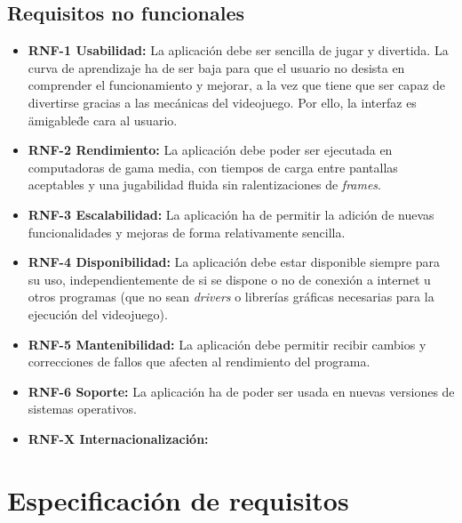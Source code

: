 \subsection{Requisitos no funcionales}
\begin{itemize}
\tightlist
\item 
	\textbf{RNF-1 Usabilidad:} La aplicación debe ser sencilla de jugar y divertida. La curva de aprendizaje ha de ser baja para que el usuario no desista en comprender el funcionamiento y mejorar, a la vez que tiene que ser capaz de divertirse gracias a las mecánicas del videojuego. Por ello, la interfaz es \"amigable\" de cara al usuario.

\item 
	\textbf{RNF-2 Rendimiento:} La aplicación debe poder ser ejecutada en computadoras de gama media, con tiempos de carga entre pantallas aceptables y una jugabilidad fluida sin ralentizaciones de \textit{frames}.
	
\item 
	\textbf{RNF-3 Escalabilidad:} La aplicación ha de permitir la adición de nuevas funcionalidades y mejoras de forma relativamente sencilla.
	
\item 
	\textbf{RNF-4 Disponibilidad:} La aplicación debe estar disponible siempre para su uso, independientemente de si se dispone o no de conexión a internet u otros programas (que no sean \textit{drivers} o librerías gráficas necesarias para la ejecución del videojuego).
	
\item 
	\textbf{RNF-5 Mantenibilidad:} La aplicación debe permitir recibir cambios y correcciones de fallos que afecten al rendimiento del programa.
	
\item 
	\textbf{RNF-6 Soporte:} La aplicación ha de poder ser usada en nuevas versiones de sistemas operativos.

\item 
	\textbf{RNF-X Internacionalización:} 
\end{itemize}
\section{Especificación de requisitos}


